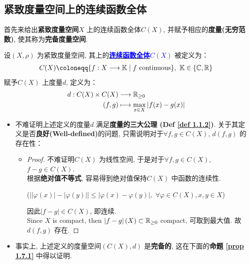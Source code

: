 \subsection{紧致度量空间上的连续函数全体}
	首先来给出\textbf{紧致度量空间$X$} 上的连续函数全体$C(X)$, 并赋予相应的\textbf{度量(无穷范数)}, 使其称为\textbf{完备度量空间}. 
	\begin{defn}\label{def 1.7.1}
		设$(X , \rho)$ 为紧致度量空间, 其上的\underline{\textcolor{blue}{\textbf{连续函数全体$C(X)$}}} 被定义为：
		\begin{align}
			C(X) \coloneqq \{ f : X \longrightarrow \mathbb{K} \mid f \,\, \text{continuous} \} , \,\, \mathbb{K} \in \{ \C , \R \}
		\end{align}
		赋予$C(X)$ 上度量$d$, 定义为：
		\begin{align}
			d : C(X) \times C(X) &\longrightarrow \mathbb{R}_{\geq 0} \\
			(f , g) &\longmapsto \max_{x \in X} \left| f(x) - g(x) \right|
		\end{align}
		
		\vspace{2em}
		
		\begin{rmk}
			\begin{itemize}
				\item 不难证明上述定义的度量$d$ 满足\textbf{度量的三大公理 (Def \ref{def 1.1.2})}. 关于其定义是否\textbf{良好(Well-defined)}的问题, 只需说明对于$\forall f , g \in C(X)$, $d(f , g)$ 的存在性：
				
				\vspace{3em}
				
				\begin{itemize}
					\item 
					\begin{proof}
						不难证明$C(X)$ 为线性空间, 于是对于$\forall f , g \in C(X)$, $f - g \in C(X)$. \\
						根据\textbf{绝对值不等式}, 容易得到绝对值保持$C(X)$ 中函数的连续性. 
						\begin{center}
							($\left| \left| \varphi(x) \right| - \left| \varphi(y) \right| \right| \leq \left| \varphi(x) - \varphi(y) \right| , \,\, \forall \varphi \in C(X) , x , y \in X$)
						\end{center}
						因此$\left| f - g \right| \in C(X)$, 即连续. \\
						Since $X$ is compact, then $\left| f - g \right| (X) \subset \mathbb{R}_{\geq 0}$ compact, 可取到最大值. 故$d(f , g)$ 存在.
					\end{proof}
				\end{itemize}
				
				\vspace{4em}
				
				\item 事实上, 上述定义的度量空间$(C(X) , d)$ 是\textbf{完备的}, 这在下面的\textbf{命题 \ref{prop 1.7.1}} 中得以证明.
			\end{itemize}
		\end{rmk}
	\end{defn}

